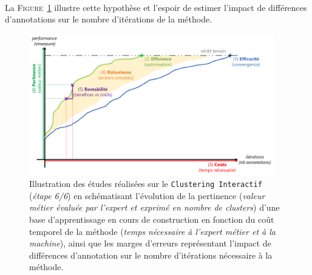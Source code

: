 	\begin{tcolorbox}[
		title=\faVial~\textbf{Hypothèse de robustesse}~\faVial,
		colback=colorTcolorboxHypothesis!15,
		colframe=colorTcolorboxHypothesis!75,
		width=\linewidth
	]
		 \\
		
		La \textsc{Figure~\ref{figure:4.6-HYPOTHESE-ROBUSTESSE}} illustre cette hypothèse et l'espoir de estimer l'impact de différences d'annotations sur le nombre d'itérations de la méthode.
		\begin{figure}[H]  %
			\centering
			\includegraphics[width=0.95\textwidth]{figures/hypotheses-06-robustesse}
			\caption{
				Illustration des études réalisées sur le \texttt{Clustering Interactif} (\textit{étape 6/6}) en schématisant l'évolution de la pertinence (\textit{valeur métier évaluée par l'expert et exprimé en nombre de clusters}) d'une base d'apprentissage en cours de construction en fonction du coût temporel de la méthode (\textit{temps nécessaire à l'expert métier et à la machine}), ainsi que les marges d'erreurs représentant l'impact de différences d'annotation sur le nombre d'itérations nécessaire à la méthode.
			}
			\label{figure:4.6-HYPOTHESE-ROBUSTESSE}
		\end{figure}
	\end{tcolorbox}
	
